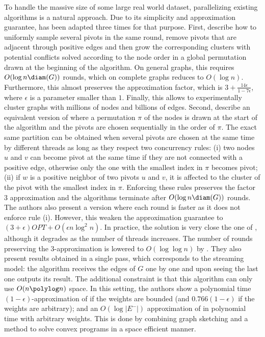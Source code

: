 To handle the massive size of some large real world dataset, parallelizing existing algorithms is a
natural approach. Due to its simplicity and approximation guarantee, \ccpivot{} has been adapted
three times for that purpose. First, \textcite{Chierichetti2014} describe how to uniformly sample
several pivots in the same round, remove pivots that are adjacent through positive edges and then
grow the corresponding clusters with potential conflicts solved according to the node order in a
global permutation drawn at the beginning of the algorithm. On general graphs, this requires $O(\log
n\diam(G))$ rounds, which on complete graphs reduces to $O(\log n)$.
Furthermore, this almost preserves the approximation factor, which is
$3+\frac{14\epsilon}{1-7\epsilon}$, where $\epsilon$ is a parameter smaller than $1$. Finally, this
allows to experimentally cluster graphs with millions of nodes and billions of edges. Second,
\textcite{ParallelCCNIPS15} describe an equivalent version of \ccpivot{} where a permutation $\pi$
of the nodes is drawn at the start of the algorithm and the pivots are chosen sequentially in the
order of $\pi$. The exact same partition can be obtained when several pivots are chosen at the same
time by different threads as long as they respect two concurrency rules: (i) two nodes $u$ and $v$
can become pivot at the same time if they are not connected with a positive edge, otherwise only the
one with the smallest index in $\pi$ becomes pivot; (ii) if $w$ is a positive neighbor of two pivots
$u$ and $v$, it is affected to the cluster of the pivot with the smallest index in $\pi$. Enforcing
these rules preserves the factor $3$ approximation and the algorithms terminate after $O(\log
n\diam(G))$ rounds. The authors also present a version where each round is faster as it does not
enforce rule (i). However, this weaken the approximation guarantee to $(3 + \epsilon)OPT +
O(\epsilon n\log^2 n)$. In practice, the solution is very close the one of \ccpivot{}, although it
degrades as the number of threads increases. The number of rounds preserving the $3$-approximation
is lowered to $O(\log\log n)$ by \textcite{Ahn2015}. They also present results obtained in a single
pass, which corresponds to the streaming model: the algorithm receives the edges of $G$ one by one
and upon seeing the last one outputs its result. The additional constraint is that this algorithm
can only use $O(n\polylog n)$ space. In this setting, the authors show a polynomial time
$(1-\epsilon)$-approximation of \maxa{} if the weights are bounded (and $0.766(1-\epsilon)$ if the
weights are arbitrary); and an $O(\log |E^-|)$ approximation of \mind{} in polynomial time with arbitrary
weights. This is done by combining graph sketching and a method to solve convex programs in a space
efficient manner.

